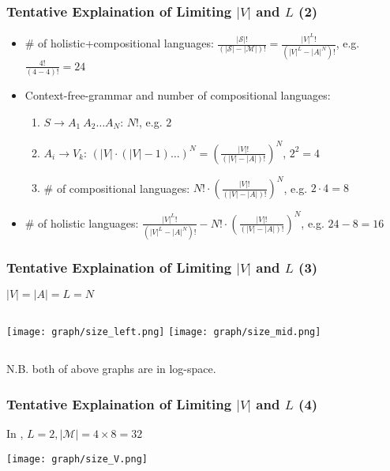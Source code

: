 \documentclass[compress,mathserif,xcolor=dvipsnames,svgnames,aspectratio=43]{beamer}
\begin{document}
\begin{frame}[c]
  \frametitle{Tentative Explaination of Limiting $|V|$ and $L$ (2)}
  \begin{itemize}
    \item \# of holistic+compositional languages: $\frac{|\mathcal{S}|!}{(|\mathcal{S}|-|\mathcal{M}|)!} = \frac{|V|^L !}{(|V|^L - |A|^N)!}$, e.g. $\frac{4!}{(4-4)!}=24$
    \item Context-free-grammar and number of compositional languages:
      \begin{enumerate}
        \item $S\rightarrow A_1\ A_2\dots A_N$: $N!$, e.g. $2$
        \item $A_i\rightarrow V_k$: $(|V|\cdot (|V|-1)\dots)^N = \left(\frac{|V|!}{(|V|-|A|)!}\right)^N$, $2^2 = 4$
        \item \# of compositional languages: $N!\cdot \left(\frac{|V|!}{(|V|-|A|)!}\right)^N$, e.g. $2\cdot 4=8$
      \end{enumerate}
    \item \# of holistic languages: $\frac{|V|^L !}{(|V|^L - |A|^N)!} - N!\cdot \left(\frac{|V|!}{(|V|-|A|)!}\right)^N$, e.g. $24-8=16$
  \end{itemize}
\end{frame}

\begin{frame}[c]
  \frametitle{Tentative Explaination of Limiting $|V|$ and $L$ (3)}
  $|V|=|A|=L=N$
  \begin{columns}
    \texttt{[image: graph/size\_left.png]}
    \texttt{[image: graph/size\_mid.png]}
  \end{columns}
  N.B. both of above graphs are in log-space.
\end{frame}

\begin{frame}[c]
  \frametitle{Tentative Explaination of Limiting $|V|$ and $L$ (4)}
  In \cite{li2019ease}, $L=2, |\mathcal{M}|=4\times 8=32$
  \begin{center}
    \texttt{[image: graph/size\_V.png]}
  \end{center}
\end{frame}
\end{document}
